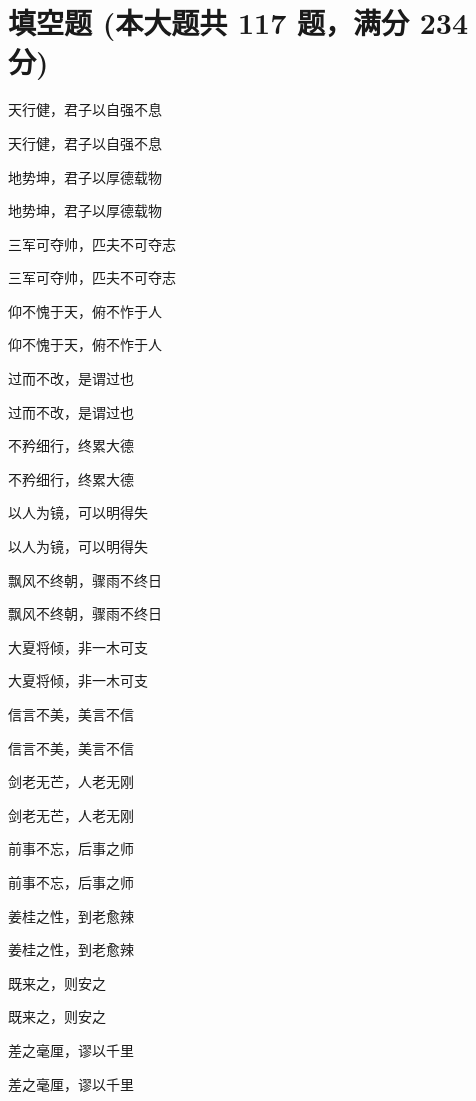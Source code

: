\documentclass[12pt, a4paper, addpoints]{exam}
\begin{document}
\section{\normalsize{填空题 (本大题共 117 题，满分 234 分)}}
\hspace{1.5cm}
\begin{multicols}{2}
\begin{questions}
\question[2] 天行健，君子以自强不息

\question[2] 天行健，君子以自强不息

\question[2] 地势坤，君子以厚德载物

\question[2] 地势坤，君子以厚德载物

\question[2] 三军可夺帅，匹夫不可夺志

\question[2] 三军可夺帅，匹夫不可夺志

\question[2] 仰不愧于天，俯不怍于人

\question[2] 仰不愧于天，俯不怍于人

\question[2] 过而不改，是谓过也

\question[2] 过而不改，是谓过也

\question[2] 不矜细行，终累大德

\question[2] 不矜细行，终累大德

\question[2] 以人为镜，可以明得失

\question[2] 以人为镜，可以明得失

\question[2] 飘风不终朝，骤雨不终日

\question[2] 飘风不终朝，骤雨不终日

\question[2] 大夏将倾，非一木可支

\question[2] 大夏将倾，非一木可支

\question[2] 信言不美，美言不信

\question[2] 信言不美，美言不信

\question[2] 剑老无芒，人老无刚

\question[2] 剑老无芒，人老无刚

\question[2] 前事不忘，后事之师

\question[2] 前事不忘，后事之师

\question[2] 姜桂之性，到老愈辣

\question[2] 姜桂之性，到老愈辣

\question[2] 既来之，则安之

\question[2] 既来之，则安之

\question[2] 差之毫厘，谬以千里

\question[2] 差之毫厘，谬以千里


\end{questions}
\end{multicols}
\end{document}
